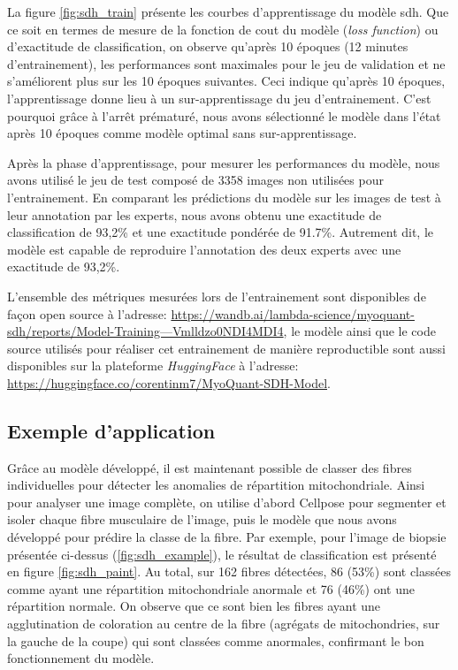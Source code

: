 La figure \ref{fig:sdh_train} présente les courbes d'apprentissage du modèle \gls{sdh}. Que ce soit en termes de mesure de la fonction de cout du modèle (\textit{loss function}) ou d'exactitude de classification, on observe qu'après 10 époques (12 minutes d'entrainement), les performances sont maximales pour le jeu de validation et ne s'améliorent plus sur les 10 époques suivantes. Ceci indique qu'après 10 époques, l'apprentissage donne lieu à un sur-apprentissage du jeu d'entrainement. C'est pourquoi grâce à l'arrêt prématuré, nous avons sélectionné le modèle dans l'état après 10 époques comme modèle optimal sans sur-apprentissage.

Après la phase d'apprentissage, pour mesurer les performances du modèle, nous avons utilisé le jeu de test composé de 3358 images non utilisées pour l'entrainement. En comparant les prédictions du modèle sur les images de test à leur annotation par les experts, nous avons obtenu une exactitude de classification de 93,2\% et une exactitude pondérée de 91.7\%. Autrement dit, le modèle est capable de reproduire l'annotation des deux experts avec une exactitude de 93,2\%.

L'ensemble des métriques mesurées lors de l'entrainement sont disponibles de façon open source à l'adresse: \href{https://wandb.ai/lambda-science/myoquant-sdh/reports/Model-Training---Vmlldzo0NDI4MDI4}{https://wandb.ai/lambda-science/myoquant-sdh/reports/Model-Training---Vmlldzo0NDI4MDI4}, le modèle ainsi que le code source utilisés pour réaliser cet entrainement de manière reproductible sont aussi disponibles sur la plateforme \textit{HuggingFace} à l'adresse: \href{https://huggingface.co/corentinm7/MyoQuant-SDH-Model}{https://huggingface.co/corentinm7/MyoQuant-SDH-Model}.

\subsection{Exemple d'application}
Grâce au modèle développé, il est maintenant possible de classer des fibres individuelles pour détecter les anomalies de répartition mitochondriale. Ainsi pour analyser une image complète, on utilise d'abord Cellpose pour segmenter et isoler chaque fibre musculaire de l'image, puis le modèle que nous avons développé pour prédire la classe de la fibre. Par exemple, pour l'image de biopsie présentée ci-dessus (\ref{fig:sdh_example}), le résultat de classification est présenté en figure \ref{fig:sdh_paint}. Au total, sur 162 fibres détectées, 86 (53\%) sont classées comme ayant une répartition mitochondriale anormale et 76 (46\%) ont une répartition normale. On observe que ce sont bien les fibres ayant une agglutination de coloration au centre de la fibre (agrégats de mitochondries, sur la gauche de la coupe) qui sont classées comme anormales, confirmant le bon fonctionnement du modèle.

